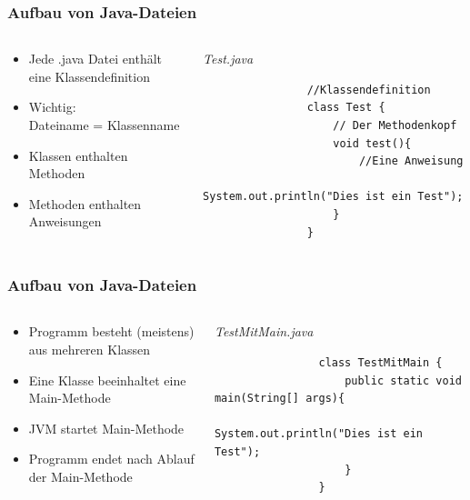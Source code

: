 \begin{frame}[fragile]
	\frametitle{Aufbau von Java-Dateien}
	\begin{columns}
		\begin{column}{0.5\textwidth}
			\small
			\begin{itemize}
			  \item Jede .java Datei enth\"alt eine Klassendefinition
			  \item Wichtig: \\
			  		Dateiname = Klassenname
			  \item Klassen enthalten Methoden
			  \item Methoden enthalten Anweisungen
			\end{itemize}
			\normalsize
		\end{column}
		\begin{column}{0.5\textwidth}{\tiny \itshape Test.java}
			\begin{lstlisting}
				//Klassendefinition
				class Test {
					// Der Methodenkopf
					void test(){
						//Eine Anweisung
						System.out.println("Dies ist ein Test");
					}
				}
			\end{lstlisting}
		\end{column}
	\end{columns}
\end{frame}

\begin{frame}[fragile]
	\frametitle{Aufbau von Java-Dateien}
	\begin{columns}
		\begin{column}{0.5\textwidth}
			\small
			\begin{itemize}
			  \item Programm besteht (meistens) aus mehreren Klassen
			  \item Eine Klasse beeinhaltet eine Main-Methode
			  \item JVM startet Main-Methode
			  \item Programm endet nach Ablauf der Main-Methode
			\end{itemize}
			\normalsize
		\end{column}
		\begin{column}{0.5\textwidth}{\tiny \itshape TestMitMain.java}
			\begin{lstlisting}
				class TestMitMain {
					public static void main(String[] args){
						System.out.println("Dies ist ein Test");
					}
				}
			\end{lstlisting}
		\end{column}
	\end{columns}
\end{frame}

